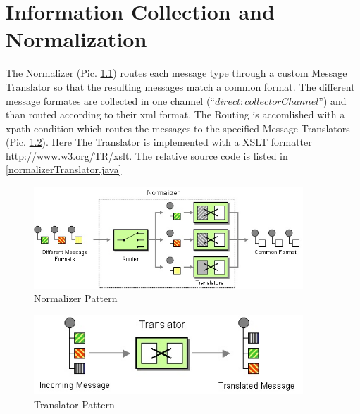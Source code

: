 \documentclass[11pt,english,ngerman, headsepline]{scrreprt}
\begin{document}
\chapter{Information Collection and Normalization}\label{chapter:normalization}

The Normalizer \cite{hohpe2003enterprise} (Pic. \ref{normalizerPic}) routes each
message type through a custom Message Translator so that the resulting messages match a common format. 
The different message formates are collected in one channel
(``$direct:collectorChannel$'') and than routed according to their xml format.
The Routing is accomlished with a xpath condition which routes the messages to
the specified Message Translators \cite{hohpe2003enterprise} (Pic.
\ref{translatorPic}). Here The Translator is implemented with a XSLT formatter
\url{http://www.w3.org/TR/xslt}.
The relative source code is listed in \ref{normalizerTranslator.java}


  \begin{figure}[h!]
	\begin{center}
	\includegraphics[width=0.9\textwidth]{pics/NormalizerDetail.jpg}
	\end{center}
	\caption{Normalizer Pattern \cite{hohpe2003enterprise}}
	\label{normalizerPic} 
   \end{figure}
   
   
   \begin{figure}[h!]
	\begin{center}
	\includegraphics[width=0.9\textwidth]{pics/MessageTranslator.jpg}
	\end{center}
	\caption{Translator Pattern \cite{hohpe2003enterprise}}
	\label{translatorPic} 
   \end{figure}
\end{document}
